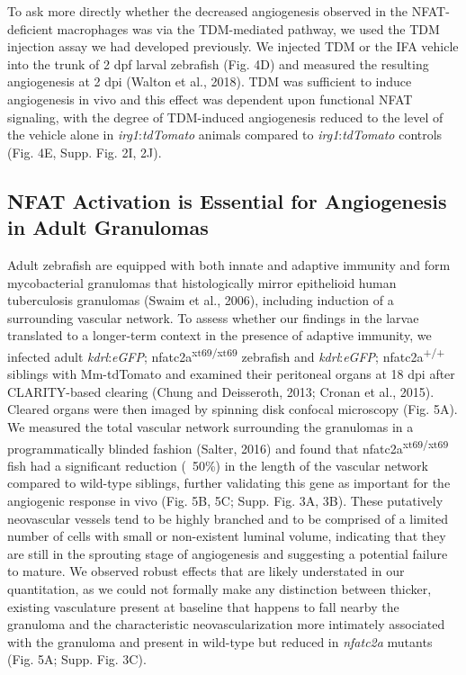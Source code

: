 To ask more directly whether the decreased angiogenesis observed in the NFAT-deficient macrophages was via the TDM-mediated pathway, we used the TDM injection assay we had developed previously. We injected TDM or the IFA vehicle  into the trunk of 2 dpf larval zebrafish (Fig. 4D) and measured the resulting angiogenesis at 2 dpi (Walton et al., 2018). TDM was sufficient to induce angiogenesis in vivo and this effect was dependent upon functional NFAT signaling, with the degree of TDM-induced angiogenesis reduced to the level of the vehicle alone in \textit{irg1}:\textit{tdTomato} animals compared to \textit{irg1}:\textit{tdTomato} controls (Fig. 4E, Supp. Fig. 2I, 2J).

\subsection{NFAT Activation is Essential for Angiogenesis in Adult Granulomas}

Adult zebrafish are equipped with both innate and adaptive immunity and form mycobacterial granulomas that histologically mirror epithelioid human tuberculosis granulomas (Swaim et al., 2006), including induction of a surrounding vascular network. To assess whether our findings in the larvae translated to a longer-term context in the presence of adaptive immunity, we infected adult \textit{kdrl}:\textit{eGFP}; nfatc2a\textsuperscript{xt69/xt69} zebrafish and \textit{kdrl}:\textit{eGFP}; nfatc2a\textsuperscript{+/+} siblings with Mm-tdTomato and examined their peritoneal organs at 18 dpi after CLARITY-based clearing (Chung and Deisseroth, 2013; Cronan et al., 2015). Cleared organs were then imaged by spinning disk confocal microscopy (Fig. 5A). We measured the total vascular network surrounding the granulomas in a programmatically blinded fashion (Salter, 2016) and found that nfatc2a\textsuperscript{xt69/xt69} fish had a significant reduction (~50\%) in the length of the vascular network compared to wild-type siblings, further validating this gene as important for the angiogenic response in vivo (Fig. 5B, 5C; Supp. Fig. 3A, 3B). These putatively neovascular vessels tend to be highly branched and to be comprised of a limited number of cells with small or non-existent luminal volume, indicating that they are still in the sprouting stage of angiogenesis and suggesting a potential failure to mature. We observed robust effects that are likely understated in our quantitation, as we could not formally make any distinction between thicker, existing vasculature present at baseline that happens to fall nearby the granuloma and the characteristic neovascularization more intimately associated with the granuloma and present in wild-type but reduced in \textit{nfatc2a} mutants (Fig. 5A; Supp. Fig. 3C).

